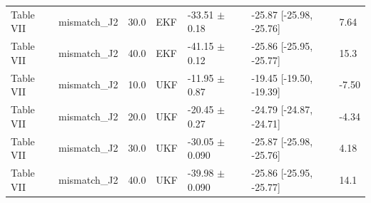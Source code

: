 \begin{table}[htbp]
{\begin{tabular}{lllllll}
Table VII & mismatch\_J2 & 30.0 & EKF & -33.51 $\pm$ 0.18 & -25.87 [-25.98, -25.76] & 7.64 \\
Table VII & mismatch\_J2 & 40.0 & EKF & -41.15 $\pm$ 0.12 & -25.86 [-25.95, -25.77] & 15.3 \\
Table VII & mismatch\_J2 & 10.0 & UKF & -11.95 $\pm$ 0.87 & -19.45 [-19.50, -19.39] & -7.50 \\
Table VII & mismatch\_J2 & 20.0 & UKF & -20.45 $\pm$ 0.27 & -24.79 [-24.87, -24.71] & -4.34 \\
Table VII & mismatch\_J2 & 30.0 & UKF & -30.05 $\pm$ 0.090 & -25.87 [-25.98, -25.76] & 4.18 \\
Table VII & mismatch\_J2 & 40.0 & UKF & -39.98 $\pm$ 0.090 & -25.86 [-25.95, -25.77] & 14.1 \\
\bottomrule
\end{tabular}}
\end{table}
